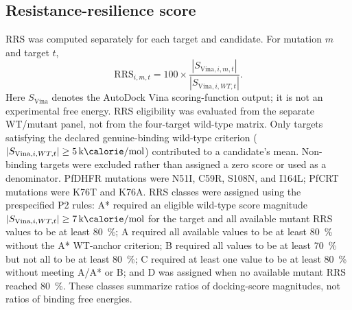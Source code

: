 \documentclass[journal=jcisd8,manuscript=article]{achemso}
\begin{document}
\subsection{Resistance-resilience score}\label{sec:methods_rrs}
RRS was computed separately for each target and candidate. For mutation $m$ and target $t$,
\begin{equation}
\mathrm{RRS}_{i,m,t}=100\times\frac{|S_{\mathrm{Vina},i,m,t}|}{|S_{\mathrm{Vina},i,WT,t}|}.
\label{eq:rrs}
\end{equation}
Here $S_{\mathrm{Vina}}$ denotes the AutoDock Vina scoring-function output; it is not an experimental free energy. RRS eligibility was evaluated from the separate WT/mutant panel, not from the four-target wild-type matrix. Only targets satisfying the declared genuine-binding wild-type criterion ($|S_{\mathrm{Vina},i,WT,t}|\geq\qty{5}{\kilo\calorie\per\mole}$) contributed to a candidate's mean. Non-binding targets were excluded rather than assigned a zero score or used as a denominator. PfDHFR mutations were N51I, C59R, S108N, and I164L; PfCRT mutations were K76T and K76A. RRS classes were assigned using the prespecified P2 rules: A* required an eligible wild-type score magnitude $|S_{\mathrm{Vina},i,WT,t}|\geq\qty{7}{\kilo\calorie\per\mole}$ for the target and all available mutant RRS values to be at least \qty{80}{\percent}; A required all available values to be at least \qty{80}{\percent} without the A* WT-anchor criterion; B required all values to be at least \qty{70}{\percent} but not all to be at least \qty{80}{\percent}; C required at least one value to be at least \qty{80}{\percent} without meeting A/A* or B; and D was assigned when no available mutant RRS reached \qty{80}{\percent}. These classes summarize ratios of docking-score magnitudes, not ratios of binding free energies.
\end{document}

